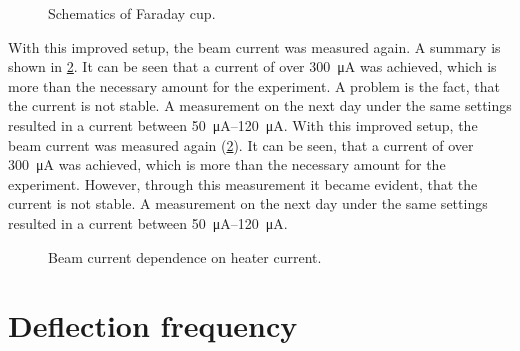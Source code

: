 \begin{figure}[h]
	\centering
	\begin{tikzpicture}
		
	\end{tikzpicture}
	
	\caption{Schematics of Faraday cup.}
	\label{fig:Schematics of Faraday cup}
\end{figure}

With this improved setup, the beam current was measured again. A summary is shown in \cref{fig:Beam current dependence on heater current}. It can be seen that a current of over \SI{300}{\micro\ampere} was achieved, which is more than the necessary amount for the experiment. A problem is the fact, that the current is not stable. A measurement on the next day under the same settings resulted in a current between \SIrange{50}{120}{\micro\ampere}.
With this improved setup, the beam current was measured again (\cref{fig:Beam current dependence on heater current}). It can be seen, that a current of over \SI{300}{\micro\ampere} was achieved, which is more than the necessary amount for the experiment. However, through this measurement it became evident, that the current is not stable. A measurement on the next day under the same settings resulted in a current between \SIrange{50}{120}{\micro\ampere}.

\begin{figure}[h]
	\centering
	\begin{tikzpicture}
		
	\end{tikzpicture}

	\caption{Beam current dependence on heater current.}
	\label{fig:Beam current dependence on heater current}
\end{figure}

\section{Deflection frequency}
\label{sec:Deflection frequency}

